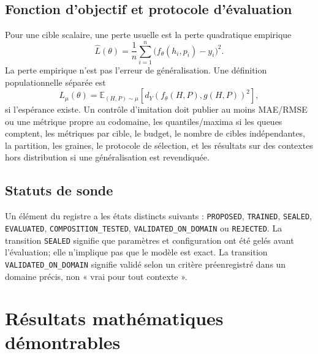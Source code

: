 \documentclass[11pt,a4paper,oneside]{report}
\newcommand{\E}{\mathbb E}
\begin{document}
\section{Fonction d'objectif et protocole d'évaluation}
Pour une cible scalaire, une perte usuelle est la perte quadratique empirique
\[
\widehat L(\theta)=\frac1{n}\sum_{i=1}^{n}\bigl(f_\theta(h_i,p_i)-y_i\bigr)^2.
\]
La perte empirique n'est pas l'erreur de généralisation. Une définition populationnelle séparée est
\[
L_\mu(\theta)=\E_{(H,P)\sim\mu}\left[d_Y(f_\theta(H,P),g(H,P))^2\right],
\]
si l'espérance existe. Un contrôle d'imitation doit publier au moins MAE/RMSE ou une métrique propre au codomaine, les quantiles/maxima si les queues comptent, les métriques par cible, le budget, le nombre de cibles indépendantes, la partition, les graines, le protocole de sélection, et les résultats sur des contextes hors distribution si une généralisation est revendiquée.

\section{Statuts de sonde}
Un élément du registre a les états distincts suivants : \texttt{PROPOSED}, \texttt{TRAINED}, \texttt{SEALED}, \texttt{EVALUATED}, \texttt{COMPOSITION\_TESTED}, \texttt{VALIDATED\_ON\_DOMAIN} ou \texttt{REJECTED}. La transition \texttt{SEALED} signifie que paramètres et configuration ont été gelés avant l'évaluation; elle n'implique pas que le modèle est exact. La transition \texttt{VALIDATED\_ON\_DOMAIN} signifie validé selon un critère préenregistré dans un domaine précis, non « vrai pour tout contexte ».

\chapter{Résultats mathématiques démontrables}
\end{document}
